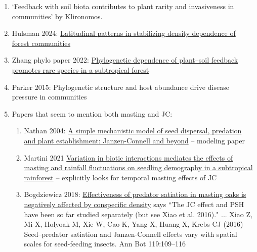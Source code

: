 \documentclass[11pt]{article}
\begin{document}
\begin{enumerate}
\item `Feedback with soil biota contributes to plant rarity and invasiveness in communities' by Klironomos. 
\item Hulsman 2024:  \href{https://www.nature.com/articles/s41586-024-07118-4}{Latitudinal patterns in stabilizing density dependence of forest communities}
\item Zhang phylo paper 2022:  \href{https://besjournals.onlinelibrary.wiley.com/doi/full/10.1111/1365-2745.13879}{Phylogenetic dependence of plant–soil feedback promotes rare species in a subtropical forest}
\item Parker 2015: Phylogenetic structure and host abundance drive disease pressure in communities
\item Papers that seem to mention both masting and JC:
\begin{enumerate}
\item Nathan 2004: \href{https://besjournals.onlinelibrary.wiley.com/doi/full/10.1111/j.0022-0477.2004.00914.x}{A simple mechanistic model of seed dispersal, predation and plant establishment: Janzen-Connell and beyond} -- modeling paper
\item Martini 2021 \href{https://besjournals.onlinelibrary.wiley.com/doi/full/10.1111/1365-2745.13833}{Variation in biotic interactions mediates the effects of masting and rainfall fluctuations on seedling demography in a subtropical rainforest} -- explicitly looks for temporal masting effects of JC
\item Bogdziewicz 2018: \href{https://link.springer.com/article/10.1007/s00442-018-4069-7}{Effectiveness of predator satiation in masting oaks is negatively affected by conspecific density} says ``The JC effect and PSH have been so far studied separately (but see Xiao et al. 2016)." ... Xiao Z, Mi X, Holyoak M, Xie W, Cao K, Yang X, Huang X, Krebs CJ (2016) Seed–predator satiation and Janzen-Connell effects vary with spatial scales for seed-feeding insects. Ann Bot 119:109–116
\end{enumerate}
\end{enumerate}

\end{document}
